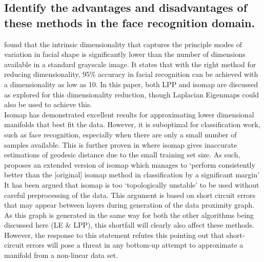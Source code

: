 \documentclass{article}
\begin{document}
\subsection{Identify the advantages and disadvantages of these methods in the face recognition domain.}
\cite{image_analysis_york} found that the intrinsic dimensionality that captures the principle modes of variation in facial shape is significantly lower than the number of dimensions available in a standard grayscale image. It states that with the right method for reducing dimensionality, 95\% accuracy in facial recognition can be achieved with a dimensionality as low as 10. In this paper, both LPP and isomap are discussed as explored for this dimensionality reduction, though Laplacian Eigenmaps could also be used to achieve this.\\

Isomap has demonstrated excellent results for approximating lower dimensional manifolds that best fit the data. However, it is suboptimal for classification work, such as face recognition, especially when there are only a small number of samples available. This is further proven in \cite{image_analysis_york} where isomap gives inaccurate estimations of geodesic distance due to the small training set size. As such, \cite{extended_isomap} proposes an extended version of isomap which manages to `perform consistently better than the [original] isomap method in classification by a significant margin'\\

It has been argued that isomap is too `topologically unstable' to be used without careful preprocessing of the data. This argument is based on short circuit errors that may appear between layers during generation of the data proximity graph. As this graph is generated in the same way for both the other algorithms being discussed here (LE \& LPP), this shortfall will clearly also affect these methods. However, the response to this statement refutes this pointing out that short-circuit errors will pose a threat in any bottom-up attempt to approximate a manifold from a non-linear data set\cite{isomap_stability}.\\
\end{document}
